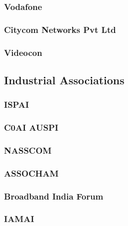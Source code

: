 \documentclass{article}
\begin{document}
\subsubsection{Vodafone}


\subsubsection{Citycom Networks Pvt Ltd}


\subsubsection{Videocon}




\subsection{Industrial Associations}
\subsubsection{ISPAI}


\subsubsection{C0AI AUSPI}


\subsubsection{NASSCOM}


\subsubsection{ASSOCHAM}


\subsubsection{Broadband India Forum}


\subsubsection{IAMAI}

\end{document}
